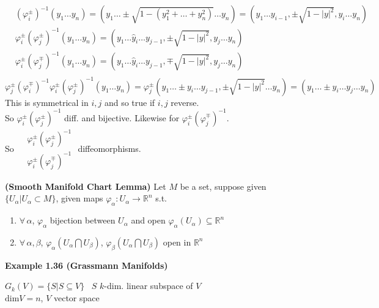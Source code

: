 \[
\begin{aligned}
  & (\varphi_i^{\pm})^{-1}(y_1 \dots y_n) = (y_1 \dots \pm \sqrt{ 1 - (y_1^2 + \dots + y_n^2) } \dots y_n) = (y_1 \dots y_{i-1}, \pm \sqrt{ 1-  |y|^2 }, y_i\dots y_n ) \\ 
 & \varphi_i^{\pm} (\varphi_j^{\pm})^{-1}(y_1 \dots y_n ) = (y_1 \dots \widehat{y}_i \dots y_{j-1} , \pm \sqrt{ 1 - |y|^2 }, y_j \dots y_n) \\ 
 & \varphi_i^{\pm} (\varphi_j^{\mp})^{-1}(y_1 \dots y_n ) = (y_1 \dots \widehat{y}_i \dots y_{j-1} , \mp \sqrt{ 1 - |y|^2 }, y_j \dots y_n) \\ 
\end{aligned}
\]
\[
\varphi_j^{\pm}(\varphi_i^{\mp})^{-1} \varphi_i^{\pm} (\varphi_j^{\pm})^{-1}(y_1 \dots y_n) = \varphi_j^{\pm}(y_1 \dots \pm y_i \dots y_{j-1}, \pm \sqrt{ 1 - |y|^2 } \dots y_n ) = (y_1 \dots \pm y_i \dots y_j \dots y_n)
\]
This is symmetrical in $i,j$ and so true if $i,j$ reverse.  \\

So $\varphi_i^{\pm}(\varphi_j^{\pm})^{-1}$ diff. and bijective.  Likewise for $\varphi_i^{\pm}(\varphi_j^{\mp})^{-1}$.  \\
So $\begin{aligned} & \varphi_i^{\pm} (\varphi_j^{\pm})^{-1} \\ 
  & \varphi_i^{\pm} (\varphi_j^{\mp})^{-1} \end{aligned}$ diffeomorphisms.  

\begin{lemma}[1.35] \textbf{(Smooth Manifold Chart Lemma)}
Let $M$ be a set, suppose given $\lbrace U_{\alpha} | U_{\alpha} \subset M \rbrace$, given maps $\varphi_{\alpha}: U_{\alpha} \to \mathbb{R}^n$ s.t.
\begin{enumerate}
\item[(i)] $\forall \, \alpha$, $\varphi_{\alpha}$ bijection between $U_{\alpha}$ and open $\varphi_{\alpha}(U_{\alpha}) \subseteq \mathbb{R}^n$
\item[(ii)] $\forall \, \alpha, \beta$, $\varphi_{\alpha}(U_{\alpha} \bigcap U_{\beta})$, $\varphi_{\beta}(U_{\alpha} \bigcap U_{\beta})$ open in $\mathbb{R}^n$
\end{enumerate}
\end{lemma}


\textbf{Example 1.36 (Grassmann Manifolds)}








$G_k(V) = \lbrace S | S \subseteq V \rbrace$ \quad \, $S$ $k$-dim. linear subspace of $V$ \\
$\text{dim}V = n$, $V$ vector space  \\

